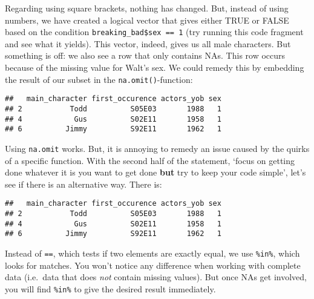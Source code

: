 \documentclass[
]{article}
\newenvironment{Shaded}{\begin{snugshade}}{\end{snugshade}}
\newcommand{\DecValTok}[1]{\textcolor[rgb]{0.00,0.00,0.81}{#1}}
\newcommand{\FunctionTok}[1]{\textcolor[rgb]{0.00,0.00,0.00}{#1}}
\newcommand{\NormalTok}[1]{#1}
\newcommand{\SpecialCharTok}[1]{\textcolor[rgb]{0.00,0.00,0.00}{#1}}
\begin{document}
Regarding using square brackets, nothing has changed. But, instead of
using numbers, we have created a logical vector that gives either TRUE
or FALSE based on the condition \texttt{breaking\_bad\$sex\ ==\ 1} (try
running this code fragment and see what it yields). This vector, indeed,
gives us all male characters. But something is off: we also see a row
that only contains NAs. This row occurs because of the missing value for
Walt's sex. We could remedy this by embedding the result of our subset
in the \texttt{na.omit()}-function:

\begin{Shaded}
\end{Shaded}

\begin{verbatim}
##   main_character first_occurence actors_yob sex
## 2           Todd          S05E03       1988   1
## 4            Gus          S02E11       1958   1
## 6          Jimmy          S92E11       1962   1
\end{verbatim}

Using \texttt{na.omit} works. But, it is annoying to remedy an issue
caused by the quirks of a specific function. With the second half of the
statement, `focus on getting done whatever it is you want to get done
\textbf{but} try to keep your code simple', let's see if there is an
alternative way. There is:

\begin{Shaded}
\end{Shaded}

\begin{verbatim}
##   main_character first_occurence actors_yob sex
## 2           Todd          S05E03       1988   1
## 4            Gus          S02E11       1958   1
## 6          Jimmy          S92E11       1962   1
\end{verbatim}

Instead of \texttt{==}, which tests if two elements are exactly equal,
we use \texttt{\%in\%}, which looks for matches. You won't notice any
difference when working with complete data (i.e.~data that does
\emph{not} contain missing values). But once NAs get involved, you will
find \texttt{\%in\%} to give the desired result immediately.
\end{document}
